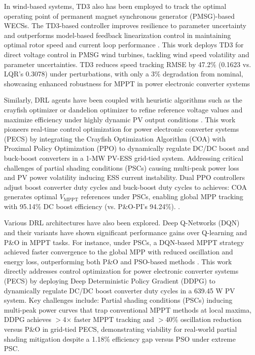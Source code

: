 In wind-based systems, TD3 also has been employed to track the optimal operating point of permanent magnet synchronous generator (PMSG)-based WECSs. The TD3-based controller improves resilience to parameter uncertainty and outperforms model-based feedback linearization control in maintaining optimal rotor speed and current loop performance \cite{zholtayev2024deep}. This work deploys TD3 for direct voltage control in PMSG wind turbines, tackling wind speed volatility and parameter uncertainties. TD3 reduces speed tracking RMSE by 47.2\% (0.1623 vs. LQR's 0.3078) under perturbations, with only a 3\% degradation from nominal, showcasing enhanced robustness for MPPT in power electronic converter systems

Similarly, DRL agents have been coupled with heuristic algorithms such as the crayfish optimizer or dandelion optimizer to refine reference voltage values and maximize efficiency under highly dynamic PV output conditions \cite{ghazi2024maximum}. This work pioneers real-time control optimization for power electronic converter systems (PECS) by integrating the Crayfish Optimization Algorithm (COA) with Proximal Policy Optimization (PPO) to dynamically regulate DC/DC boost and buck-boost converters in a 1-MW PV-ESS grid-tied system. Addressing critical challenges of partial shading conditions (PSCs) causing multi-peak power loss and PV power volatility inducing ESS current instability. Dual PPO controllers adjust boost converter duty cycles and buck-boost duty cycles to achieves: COA generates optimal $V_\text{MPPT}$ references under PSCs, enabling global MPP tracking with 95.14\% DC boost efficiency (vs. P\&O-PI's 94.24\%).  .

Various DRL architectures have also been explored. Deep Q-Networks (DQN) and their variants have shown significant performance gains over Q-learning and P\&O in MPPT tasks. For instance, under PSCs, a DQN-based MPPT strategy achieved faster convergence to the global MPP with reduced oscillation and energy loss, outperforming both P\&O and PSO-based methods \cite{yew2023investigating}. This work directly addresses control optimization for power electronic converter systems (PECS) by deploying Deep Deterministic Policy Gradient (DDPG) to dynamically regulate DC/DC boost converter duty cycles in a 639.45 W PV system. Key challenges include: Partial shading conditions (PSCs) inducing multi-peak power curves that trap conventional MPPT methods at local maxima, DDPG achieves $>$4$\times$ faster MPPT tracking and $>$40\% oscillation reduction versus P\&O in grid-tied PECS, demonstrating viability for real-world partial shading mitigation despite a 1.18\% efficiency gap versus PSO under extreme PSC.

